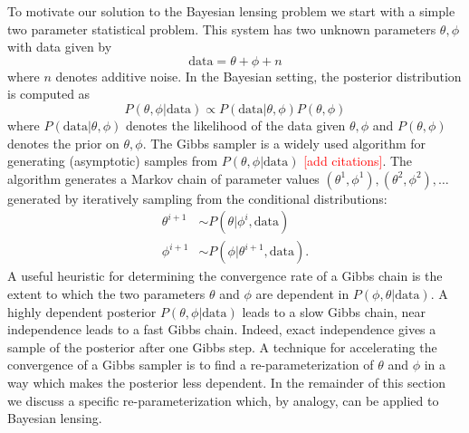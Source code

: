 \documentclass[noinfoline]{imsart}
\begin{document}
To motivate our solution to the Bayesian lensing problem we start with a simple two parameter statistical problem.  This system has two unknown parameters $\theta, \phi$ with data given by
\[\text{data} = \theta + \phi + n\]
where $n$ denotes additive noise.  In the Bayesian setting, the posterior distribution is computed as 
\begin{equation}
\label{post1}
 P(\theta,\phi|\text{data})\propto P(\text{data}|\theta, \phi) P(\theta,\phi) 
 \end{equation}
where $P(\text{data}|\theta, \phi)$ denotes the likelihood of the data given  $\theta, \phi$ and $P(\theta,\phi)$ denotes the  prior on $\theta, \phi$. 
The Gibbs sampler is a widely used algorithm for generating (asymptotic) samples from  $P(\theta, \phi|\text{data})$ \textcolor{red}{[add citations]}. The algorithm generates a Markov chain of parameter values $(\theta^{1}, \phi^{1}), (\theta^{2}, \phi^{2}),\ldots$ generated by iteratively sampling from the conditional distributions:
\begin{align*}
\theta^{i+1} &\sim P(\theta|\phi^i,\text{data})\\
\phi^{i+1}   &\sim P(\phi|\theta^{i+1},\text{data}).
\end{align*}
A useful heuristic for determining the convergence rate of a Gibbs chain is the extent to which the two parameters $\theta$ and $\phi$ are dependent in $P(\phi, \theta|\text{data})$. A highly dependent posterior $P(\theta, \phi|\text{data})$ leads to a slow Gibbs chain, near independence leads to a fast Gibbs chain. Indeed, exact independence gives a sample of the posterior after one Gibbs step.  A technique for accelerating the convergence of a Gibbs sampler is to find a  re-parameterization of $\theta$ and $\phi$ in a way which makes the posterior less dependent. In the remainder of this section we discuss a specific re-parameterization which, by analogy, can be applied to Bayesian lensing.
\end{document}
